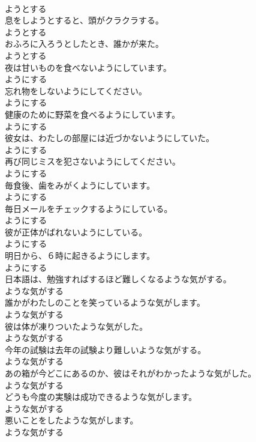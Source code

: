 \documentclass[8pt]{extreport}
\begin{document}
\begin{CJK}{UTF8}{min}
\\	ようとする	
\\	息をしようとすると、頭がクラクラする。	
\\	ようとする	
\\	おふろに入ろうとしたとき、誰かが来た。	
\\	ようとする	
\\	夜は甘いものを食べないようにしています。	
\\	ようにする	
\\	忘れ物をしないようにしてください。	
\\	ようにする	
\\	健康のために野菜を食べるようにしています。	
\\	ようにする	
\\	彼女は、わたしの部屋には近づかないようにしていた。	
\\	ようにする	
\\	再び同じミスを犯さないようにしてください。	
\\	ようにする	
\\	毎食後、歯をみがくようにしています。	
\\	ようにする	
\\	毎日メールをチェックするようにしている。	
\\	ようにする	
\\	彼が正体がばれないようにしている。	
\\	ようにする	
\\	明日から、６時に起きるようにします。	
\\	ようにする	
\\	日本語は、勉強すればするほど難しくなるような気がする。	
\\	ような気がする	
\\	誰かがわたしのことを笑っているような気がします。	
\\	ような気がする	
\\	彼は体が凍りついたような気がした。	
\\	ような気がする	
\\	今年の試験は去年の試験より難しいような気がする。	
\\	ような気がする	
\\	あの箱が今どこにあるのか、彼はそれがわかったような気がした。	
\\	ような気がする	
\\	どうも今度の実験は成功できるような気がします。	
\\	ような気がする	
\\	悪いことをしたような気がします。	
\\	ような気がする	

\end{CJK}
\end{document}
